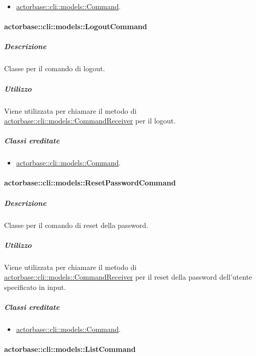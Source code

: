 \documentclass{scalatekids-article}
\begin{document}
\begin{itemize}
\item \hyperref[sec:actorbase::cli::models::Command]{actorbase::cli::models::Command}.
\end{itemize}

\paragraph{actorbase::cli::models::LogoutCommand}
\label{sec:actorbase::cli::models::LogoutCommand}

\subparagraph{Descrizione}

Classe per il comando di logout.

\subparagraph{Utilizzo}

Viene utilizzata per chiamare il metodo di
\hyperref[sec:actorbase::cli::models::CommandReceiver]{actorbase::cli::models::CommandReceiver} per il logout.

\subparagraph{Classi ereditate}

\begin{itemize}
\item \hyperref[sec:actorbase::cli::models::Command]{actorbase::cli::models::Command}.
\end{itemize}

\paragraph{actorbase::cli::models::ResetPasswordCommand}
\label{sec:actorbase::cli::models::ResetPasswordCommand}

\subparagraph{Descrizione}

Classe per il comando di reset della password.

\subparagraph{Utilizzo}

Viene utilizzata per chiamare il metodo di
\hyperref[sec:actorbase::cli::models::CommandReceiver]{actorbase::cli::models::CommandReceiver} per il reset della password
dell'utente specificato in input.

\subparagraph{Classi ereditate}

\begin{itemize}
\item \hyperref[sec:actorbase::cli::models::Command]{actorbase::cli::models::Command}.
\end{itemize}

\paragraph{actorbase::cli::models::ListCommand}
\label{sec:actorbase::cli::models::ListCommand}
\end{document}
